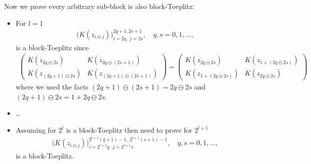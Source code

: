 \documentclass{iitthesis}          %
\begin{document}

\iffalse
Now we prove every arbitrary sub-block is also block-Toeplitz: 
\begin{itemize}
\item For $l=1$
\begin{align*}
\bigl( K(z_{i \ominus j})\bigr)_{i=2q, \; j=2s}^{2q+1, 2s+1}, \quad q,s=0,1,\dots,
\end{align*}
is a block-Toeplitz since
\begin{align*}
\begin{pmatrix}
K(z_{2q \ominus 2s}) & K(z_{2q \ominus (2s +1)}) \\
K(z_{(2q+1) \ominus 2s}) & K(z_{(2q+1) \ominus (2s +1)}) 
\end{pmatrix}
=
\begin{pmatrix}
K(z_{2q \ominus 2s}) & K(z_{1 + (2q \ominus 2s)}) \\
K(z_{1 + (2q \ominus 2s)}) & K(z_{ 2q \ominus 2s}) 
\end{pmatrix}
\end{align*}
where we used the facts $(2q+1) \ominus (2s+1) = 2q \ominus 2s$ and $(2q+1) \ominus 2s = 1 + 2q \ominus 2s$.

\item \ldots

\item Assuming for $2^{l}$ is a block-Toeplitz then need to prove for $2^{l+1}$ 
\begin{align*}
\bigl( K(z_{i \ominus j})\bigr)_{i=2^{l+1}q, \; j=2^{l+1}s}^{2^{l+1}(q+1)-1, \; 2^{l+1}(s+1)-1}, \quad q,s=0,1,\dots,
\end{align*}
is a block-Toeplitz.


\end{itemize}
\end{document}
